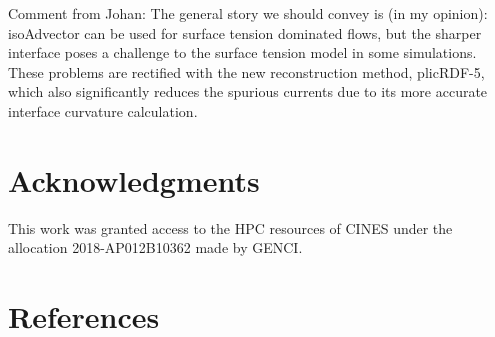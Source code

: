 \documentclass[review]{elsarticle}
\begin{document}
Comment from Johan: 
The general story we should convey is (in my opinion): isoAdvector can be used for surface tension dominated flows, but the sharper interface poses a challenge to the surface tension model in some simulations. These problems are rectified with the new reconstruction method, plicRDF-5, which also significantly reduces the spurious currents due to its more accurate interface curvature calculation.


\section*{Acknowledgments}
\noindent
This  work  was  granted  access  to  the  HPC  resources  of CINES under the 
allocation 2018-AP012B10362 made by GENCI.

\clearpage
\section*{References}


\end{document}

